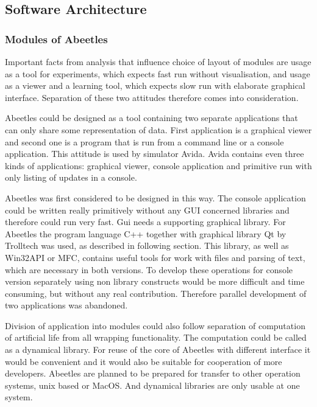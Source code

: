 \documentclass[a4paper,12pt]{report}
\begin{document}
\subsection {Software Architecture}
\subsubsection {Modules of Abeetles}
Important facts from analysis that influence choice of layout of modules are usage as a tool for experiments, which expects fast run without visualisation, and usage as a viewer and a learning tool, which expects slow run with elaborate graphical interface. Separation of these two attitudes therefore comes into consideration.

Abeetles could be designed as a tool containing two separate applications that can only share some representation of data. First application is a graphical viewer and second one is a program that is run from a command line or a console application. This attitude is used by simulator Avida. Avida contains even three kinds of applications: graphical viewer, console application and primitive run with only listing of updates in a console.

Abeetles was first considered to be designed in this way. The console application could be written really primitively without any GUI concerned libraries and therefore could run very fast. Gui needs a supporting graphical library. For Abeetles the program language C++ together with graphical library Qt by Trolltech was used, as described in following section. This library, as well as Win32API or MFC, contains useful tools for work with files and parsing of text, which are necessary in both versions. To develop these operations for console version separately using non library constructs would be more difficult and time consuming, but without any real contribution. Therefore parallel development of two applications was abandoned. 

Division of application into modules could also follow separation of computation of artificial life from all wrapping functionality. The computation could be called as a dynamical library. For reuse of the core of Abeetles with different interface it would be convenient and it would also be suitable for cooperation of more developers. Abeetles are planned to be prepared for transfer to other operation systems, unix based or MacOS. And dynamical libraries are only usable at one system.
\end{document}
